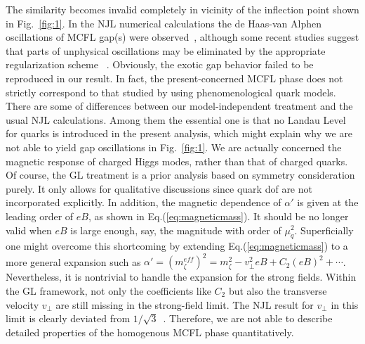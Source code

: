 \documentclass[12pt]{article}
\begin{document}
The similarity becomes invalid completely in vicinity of the inflection point shown in Fig.~\ref{fig:1}. 
In the NJL numerical calculations the de Haas-van Alphen oscillations of MCFL gap(s) were
observed~\cite{ferrer2005magnetic,fukushima2008color}, although some recent studies suggest that parts of
unphysical oscillations may be eliminated by the appropriate regularization scheme ~\cite{allen2015magnetized}.
Obviously, the exotic gap behavior failed to be reproduced in our result. 
In fact, the present-concerned MCFL phase does not strictly correspond to that studied by using phenomenological quark models. There are some of differences between our model-independent treatment and the usual
NJL calculations.
Among them the essential one is that no Landau Level for quarks is introduced in the present analysis, which might explain why we are not able to yield gap oscillations in Fig.~\ref{fig:1}. 
We are actually concerned the magnetic response of charged Higgs modes, rather than that of charged quarks. 
Of course, the GL treatment is a prior analysis based on symmetry consideration purely. It only allows for qualitative discussions since quark dof are not incorporated explicitly. 
In addition, the magnetic dependence of $\alpha'$ is given at the leading order of $eB$, as shown in Eq.(\ref{eq:magneticmass}). 
It should be no longer valid when $eB$ is large enough, say, the magnitude with order of $\mu_q^2$.
Superficially one might overcome this shortcoming by extending Eq.(\ref{eq:magneticmass}) to a more general expansion such as $\alpha'=(m_\zeta^{eff})^2 = m_\zeta^2 - v_\perp^2eB + C_2 (eB)^2 + \cdots$. Nevertheless, it is nontrivial to handle the expansion for the strong fields.  
Within the GL framework, not only the coefficients like $C_2$ but also the transverse velocity $v_\perp$ are still missing in the strong-field limit. The NJL result for $v_\perp$ in this limit is clearly deviated from $1/\sqrt{3}$~\cite{sen2015anisotropic}.
Therefore, we are not able to describe detailed properties of the homogenous MCFL phase quantitatively.
\end{document}
